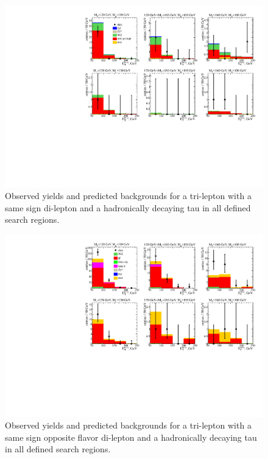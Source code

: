 \begin{figure}[htp]
\begin{center}
\includegraphics[width=1.0\textwidth]{plots/ossf0tau1.pdf}
\caption{Observed yields and predicted backgrounds for a tri-lepton with a same sign di-lepton and a hadronically decaying tau in all defined search regions.}
\label{fig:SStau1}
\end{center}
\end{figure}
\begin{figure}[htp]
\begin{center}
\includegraphics[width=1.0\textwidth]{plots/ossf0tau1_C2.pdf}
\caption{Observed yields and predicted backgrounds for a tri-lepton with a same sign opposite flavor di-lepton and a hadronically decaying tau in all defined search regions.}
\label{fig:SSOFtau1}
\end{center}
\end{figure}
